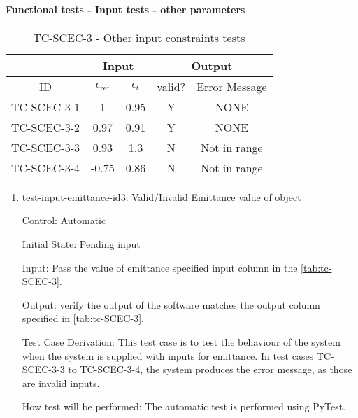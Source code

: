 \documentclass[12pt, titlepage]{article}
\begin{document}
\paragraph{Functional tests - Input tests - other parameters}


\begin{table}[h!]
\begin{center}
\begin{tabular}{ lcccc }
\hline
\multicolumn{1}{l|}{}   & \multicolumn{2}{c|}{Input}                            & \multicolumn{2}{c}{Output} \\ 

\hline

\multicolumn{1}{c|}{ID}  &   $\epsilon_\text{ref}$  &   \multicolumn{1}{c|}{$\epsilon_t$}   &   {valid?}   &   Error Message    \\ \hline

TC-SCEC-3-1   &   1      & 0.95   & Y   & NONE          \\
TC-SCEC-3-2   &   0.97   & 0.91   & Y   & NONE          \\
TC-SCEC-3-3   &   0.93   & 1.3    & N   & Not in range  \\
TC-SCEC-3-4   &   -0.75  & 0.86   & N   & Not in range  \\ 

\hline


\end{tabular}
\caption{TC-SCEC-3 - Other input constraints tests}
\label{tab:tc-SCEC-3}
\end{center}
\end{table}

\begin{enumerate}   



\item{test-input-emittance-id3: Valid/Invalid Emittance value of object  \\}

Control: Automatic
					
Initial State: Pending input 
					
Input: Pass the value of emittance specified input column in the \autoref{tab:tc-SCEC-3}.
					
Output: verify the output of the software matches the output column specified in \autoref{tab:tc-SCEC-3}. 

Test Case Derivation: This test case is to test the behaviour of the system when the system is supplied with inputs for emittance. In test cases TC-SCEC-3-3 to TC-SCEC-3-4, the system produces the error message, as those are invalid inputs. 
					
How test will be performed: The automatic test is performed using PyTest.  


\end{enumerate}
\end{document}
